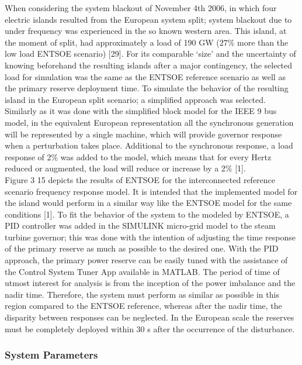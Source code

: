 When considering the system blackout of November 4th 2006, in which four electric islands resulted from the European system split; system blackout due to under frequency was experienced in the so known western area. This island, at the moment of split, had approximately a load of 190 GW (27\% more than the low load ENTSOE scenario) [29]. For its comparable ‘size’ and the uncertainty of knowing beforehand the resulting islands after a major contingency, the selected load for simulation was the same as the ENTSOE reference scenario as well as the primary reserve deployment time. To simulate the behavior of the resulting island in the European split scenario; a simplified approach was selected. Similarly as it was done with the simplified block model for the IEEE 9 bus model, in the equivalent European representation all the synchronous generation will be represented by a single machine, which will provide governor response when a perturbation takes place. Additional to the synchronous response, a load response of 2\% was added to the model, which means that for every Hertz reduced or augmented, the load will reduce or increase by a 2\% [1]. \\
 
Figure 3 15 depicts the results of ENTSOE for the interconnected reference scenario frequency response model. It is intended that the implemented model for the island would perform in a similar way like the ENTSOE model for the same conditions [1].
To fit the behavior of the system to the modeled by ENTSOE, a PID controller was added in the SIMULINK micro-grid model to the steam turbine governor; this was done with the intention of adjusting the time response of the primary reserve as much as possible to the desired one. With the PID approach, the primary power reserve can be easily tuned with the assistance of the Control System Tuner App available in MATLAB. The period of time of utmost interest for analysis is from the inception of the power imbalance and the nadir time. Therefore, the system must perform as similar as possible in this region compared to the ENTSOE reference, whereas after the nadir time, the disparity between responses can be neglected. In the European scale the reserves must be completely deployed within 30 s after the occurrence of the disturbance.  






\subsubsection{System Parameters}


